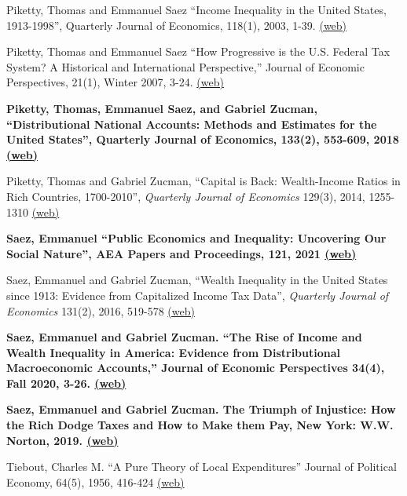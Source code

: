 \documentclass[landscape]{slides}
\begin{document}
\begin{slide}
{Piketty, Thomas and Emmanuel Saez ``Income Inequality in the United States, 1913-1998'', Quarterly Journal of Economics, 118(1), 2003, 1-39. \href{http://links.jstor.org/stable/pdfplus/25053897.pdf} {(web)} 

Piketty, Thomas and Emmanuel Saez ``How Progressive is the U.S. Federal Tax System? A Historical and International Perspective,'' Journal of Economic Perspectives, 21(1), Winter 2007, 3-24.
 \href{http://www.econ.berkeley.edu/~saez/piketty-saezJEP07taxprog.pdf} {(web)} 
 
\textbf{Piketty, Thomas, Emmanuel Saez, and Gabriel Zucman,  ``Distributional National Accounts:
Methods and Estimates for the United States'', Quarterly Journal of Economics, 133(2), 553-609, 2018
\href{https://eml.berkeley.edu/~saez/PSZ2018QJE.pdf} {(web)} }

Piketty, Thomas and Gabriel Zucman,  ``Capital is Back: Wealth-Income Ratios in Rich Countries, 1700-2010'',  \emph{Quarterly Journal of Economics} 129(3), 2014, 1255-1310
\href{http://www.econ.berkeley.edu/~saez/PikettyZucman2014QJE.pdf} {(web)}

\textbf{Saez, Emmanuel  ``Public Economics and Inequality: Uncovering Our Social Nature'', AEA Papers and Proceedings, 121, 2021
\href{https://eml.berkeley.edu/~saez/saez-AEAlecture.pdf} {(web)} }

Saez, Emmanuel and Gabriel Zucman, ``Wealth Inequality in the United States since 1913: Evidence from Capitalized Income Tax Data'', \emph{Quarterly Journal of Economics}  131(2), 2016, 519-578
\href{http://eml.berkeley.edu/~saez/SaezZucman2016QJE.pdf}{(web)}

\textbf{Saez, Emmanuel and Gabriel Zucman. ``The Rise of Income and Wealth Inequality in America: Evidence from Distributional Macroeconomic Accounts,'' Journal of Economic Perspectives 34(4), Fall 2020, 3-26.
\href{https://eml.berkeley.edu/~saez/SaezZucman2020JEP.pdf}{(web)} }

\textbf{Saez, Emmanuel and Gabriel Zucman. The Triumph of Injustice: How the Rich Dodge Taxes and How to Make them Pay, New York: W.W. Norton, 2019. 
\href{https://eml.berkeley.edu/~saez/SZ2019Slides.pdf} {(web)} }

Tiebout,  Charles M.  ``A Pure Theory of Local Expenditures''
Journal of Political Economy, 64(5), 1956, 416-424
\href{https://www.jstor.org/stable/pdf/1826343.pdf}{(web)}

}


\end{slide}
\end{document}
